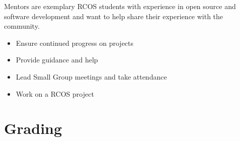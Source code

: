 \documentclass[12pt]{article}
\begin{document}
    Mentors are exemplary RCOS students with experience in open source and software development and want to help share their experience with the community.

    \begin{itemize}
        \item Ensure continued progress on projects
        \item Provide guidance and help
        \item Lead Small Group meetings and take attendance
        \item Work on a RCOS project
    \end{itemize}

    \section{Grading}

\end{document}
